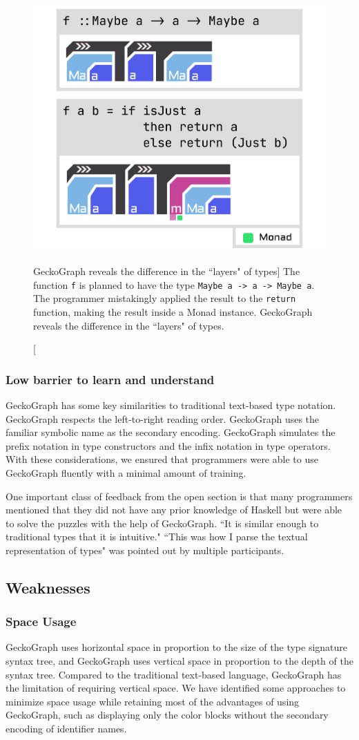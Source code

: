 \begin{figure}[hbt]
  \includegraphics[width=0.6\linewidth]{figures/Maybe}
  \caption[GeckoGraph reveals the difference in the ``layers" of types]{\label{fig:maybe} The function \texttt{f} is planned to have the type \texttt{Maybe a -> a -> Maybe a}. The programmer mistakingly applied the result to the \texttt{return} function, making the result inside a Monad instance.  GeckoGraph reveals the difference in the ``layers" of types. }
\end{figure}


\subsubsection{Low barrier to learn and understand}
GeckoGraph has some key similarities to traditional text-based type notation. GeckoGraph respects the left-to-right reading order. GeckoGraph uses the familiar symbolic name as the secondary encoding. GeckoGraph simulates the prefix notation in type constructors and the infix notation in type operators. With these considerations, we ensured that programmers were able to use GeckoGraph fluently with a minimal amount of training. 

One important class of feedback from the open section is that many programmers mentioned that they did not have any prior knowledge of Haskell but were able to solve the puzzles with the help of GeckoGraph.
``It is similar enough to traditional types that it is intuitive." ``This was how I parse the textual representation of types" was pointed out by multiple participants.

\subsection{Weaknesses}
\subsubsection{Space Usage}\label{subsec:space}
GeckoGraph uses horizontal space in proportion to the size of the type signature syntax tree, and GeckoGraph uses vertical space in proportion to the depth of the syntax tree. Compared to the traditional text-based language, GeckoGraph has the limitation of requiring vertical space. We have identified some approaches to minimize space usage while retaining most of the advantages of using GeckoGraph, such as displaying only the color blocks without the secondary encoding of identifier names.


